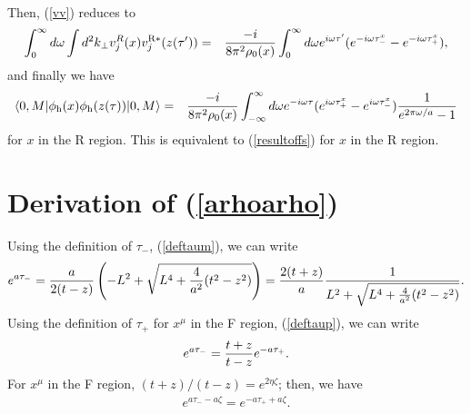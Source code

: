 \documentclass[aps,prd,preprintnumbers,nofootinbib,showpacs,11pt]{revtex4}%
\begin{document}
\begin{widetext}
\begin{eqnarray}
\end{eqnarray}
Then, (\ref{vv}) reduces to
\begin{eqnarray}
\int_0^\infty d\omega \int d^2k_\perp v_j^R(x)v_j^{\rm R*}(z(\tau'))
&=&{ -i\over 8\pi^2\rho_0(x)} 
\int_0^\infty d\omega e^{i\omega\tau'} (e^{-i\omega\tau_-^x}-e^{-i\omega\tau_+^x}),
\end{eqnarray}
and finally we have 
\begin{eqnarray}
\langle0,M|\phi_{\rm h}(x)\phi_{\rm h}(z(\tau))|0,M\rangle
&=&{ -i\over 8\pi^2\rho_0(x)} 
\int_{-\infty}^{\infty} d\omega e^{-i\omega\tau} (e^{i\omega\tau_+^x}-e^{i\omega\tau_-^x}){1\over e^{2\pi\omega/a}-1}
\end{eqnarray}
for $x$ in the R region. This is equivalent to (\ref{resultoffs}) for $x$ in the R region. 


\section{Derivation of (\ref{arhoarho})}
Using the definition of $\tau_-$, (\ref{deftaum}), we can write
\begin{eqnarray}
e^{a\tau_-}={a\over 2(t-z)}\left(-L^2+\sqrt{L^4+{4\over a^2}(t^2-z^2)}\right)
={2(t+z)\over a}{1\over L^2+\sqrt{L^4+{4\over a^2}(t^2-z^2)}}.
\end{eqnarray}
Using the definition of $\tau_+$ for $x^\mu$ in the F region, 
(\ref{deftaup}), we can write
\begin{eqnarray}
e^{a\tau_-}={t+z\over t-z}e^{-a\tau_+}.
\end{eqnarray}
For $x^\mu$ in the F region, $(t+z)/(t-z)=e^{2\eta\zeta}$; then, we have
\begin{eqnarray}
e^{a\tau_--a\zeta}=e^{-a\tau_++a\zeta}.
\end{eqnarray}


\end{widetext}
\end{document}
